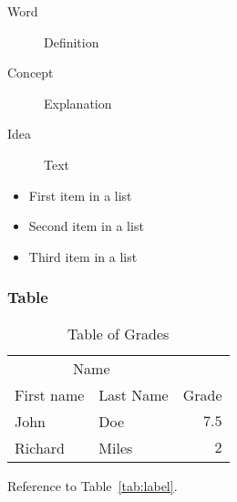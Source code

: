 \documentclass[
10pt, %
a4paper, %
oneside, %
headinclude,footinclude, %
BCOR5mm, %
]{scrartcl}
\begin{document}
\begin{description}
\item[Word] Definition
\item[Concept] Explanation
\item[Idea] Text
\end{description}

\lipsum[12] %

\begin{itemize}[noitemsep] %
\item First item in a list
\item Second item in a list
\item Third item in a list
\end{itemize}

\subsubsection{Table}

\lipsum[13] %

\begin{table}[hbt]
\caption{Table of Grades}
\centering
\begin{tabular}{llr}
\toprule
\multicolumn{2}{c}{Name} \\
\cmidrule(r){1-2}
First name & Last Name & Grade \\
\midrule
John & Doe & $7.5$ \\
Richard & Miles & $2$ \\
\bottomrule
\end{tabular}
\label{tab:label}
\end{table}

Reference to Table~\vref{tab:label}. %





%


\end{document}
